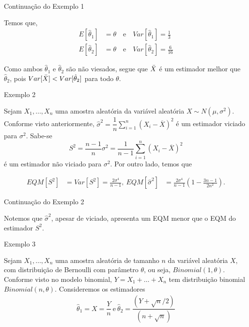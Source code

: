 \documentclass[12pt]{beamer}
\begin{document}
\begin{frame}{Continuação do Exemplo 1}
\begin{block}{}
\justifying
Temos que,
\begin{align*}
E[\hat{\theta}_1] &= \theta \quad \text{e} \quad Var[\hat{\theta}_1] = \frac{1}{3}\\
E[\hat{\theta}_2] &= \theta \quad \text{e} \quad Var[\hat{\theta}_2] = \frac{6}{16}
\end{align*}

Como ambos $\hat{\theta}_1$ e $\hat{\theta}_2$ são não viesados, segue que $\Bar{X}$ é um estimador melhor que $\hat{\theta}_2$, pois $Var[\Bar{X}] < Var[\hat{\theta}_2]$ para todo $\theta$.
\end{block}
\end{frame}

\begin{frame}{Exemplo 2}
\begin{block}{}
\justifying
Sejam $X_1, \ldots, X_n$ uma amostra aleatória da variável aleatória $X \sim N(\mu, \sigma^2)$. Conforme visto anteriormente, $\hat{\sigma}^2=\dfrac{1}{n} {\displaystyle \sum_{i=1}^{n}(X_i - \overline{X})^2}$ é um estimador viciado para $\sigma^2$. Sabe-se 
$$S^2 = \dfrac{n-1}{n}\sigma^2 = \dfrac{1}{n-1} \sum_{i=1}^{n} (X_i - \overline{X})^2$$
é um estimador não viciado para $\sigma^2$. Por outro lado, temos que

\begin{align*}
EQM[S^2] &= Var[S^2] = \frac{2\sigma^4}{n - 1}, \
EQM[\hat{\sigma}^2] &= \frac{2\sigma^4}{n - 1} \left( 1 - \frac{3n - 1}{2n^2} \right).
\end{align*}
\end{block}
\end{frame}

\begin{frame}{Continuação do Exemplo 2}
\begin{block}{}
\justifying
Notemos que $\hat{\sigma}^2$, apesar de viciado, apresenta um EQM menor que o EQM do estimador $S^2$.
\end{block}
\end{frame}

\begin{frame}{Exemplo 3}
\begin{block}{}
\justifying
Sejam $X_1, \ldots, X_n$ uma amostra aleatória de tamanho $n$ da variável aleatória $X$, com distribuição de Bernoulli com parâmetro $\theta$, ou seja, $Binomial(1, \theta)$. Conforme visto no modelo binomial, $Y = X_1 + \ldots + X_n$ tem distribuição binomial $Binomial(n, \theta)$. Consideremos os estimadores 
\begin{align*}
\hat{\theta}_1 = X = \dfrac{Y}{n}~ \textrm{e}~\hat{\theta}_2 = \dfrac{(Y + \sqrt{n}/2)}{(n + \sqrt{n})}
\end{align*}
\end{block}
\end{frame}
\end{document}
